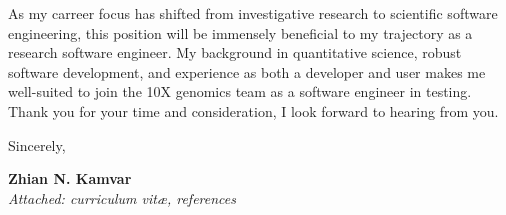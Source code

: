 \vspace{1ex}

As my carreer focus has shifted from investigative research to scientific
software engineering, this position will be immensely beneficial to my
trajectory as a research software engineer. My background in quantitative
science, robust software development, and experience as both a developer and 
user makes me well-suited to join the 10X genomics team as a software engineer
in testing. Thank you for your time and consideration, I look forward to
hearing from you. 

\vspace{2ex}

Sincerely,

\vspace{5ex}

\textbf{Zhian N. Kamvar}\\
\textit{Attached: curriculum vit\ae{}, references}













\clearpage

